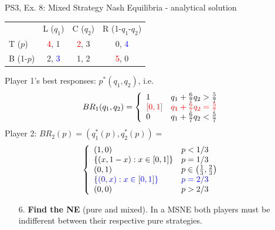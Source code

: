 \begin{frame}{PS3, Ex. 8: Mixed Strategy Nash Equilibria - analytical solution}
  \begin{multicols}{2}
    \begin{table}
      \begin{tabular}{l|c|c|c|}
          \multicolumn{1}{c}{}  & \multicolumn{1}{c}{L ($q_1$)} & \multicolumn{1}{c}{C ($q_2$)} & \multicolumn{1}{c}{R (1-$q_1$-$q_2$)} \\\cline{2-4}
          T ($p$)   & \textcolor{red}{4}, 1 & \textcolor{red}{2}, 3 & 0, \textcolor{blue}{4} \\\cline{2-4}
          B (1-$p$) & 2, \textcolor{blue}{3} & 1, 2 & \textcolor{red}{5}, 0 \\\cline{2-4}
      \end{tabular}
    \end{table}
    Player 1's best responses: $p^{*}(q_1,q_2)$, i.e.
    \begin{align*}
      BR_1(q_1,q_2)=
      \left\{ \begin{array}{ll}
          1                 & q_1 + \frac{6}{7}q_2 > \frac{5}{7}\\
          \textcolor{red}{\left[0,1\right]}  & \textcolor{red}{q_1 + \frac{6}{7}q_2 = \frac{5}{7}}\\
          0                 & q_1 + \frac{6}{7}q_2 < \frac{5}{7}
      \end{array}\right.
    \end{align*}
    Player 2: $BR_2(p)=\left(q_1^{*}(p),q_2^{*}(p)\right)=$
    \begin{align*}
      \left\{ \begin{array}{ll}
          (1,0)                 & p < 1/3 \\
          \{(x,1-x):x\in[0,1]\} & p = 1/3 \\
          (0,1)                 & p\in\left(\frac{1}{3},\frac{2}{3}\right)\\
          \textcolor{blue}{\{(0,x):x\in[0,1]\}}   & \textcolor{blue}{p = 2/3} \\
          (0,0)                 & p > 2/3
      \end{array}\right.
    \end{align*}
  \vfill\null \columnbreak
    \begin{itemize}
      \item[6.] \textbf{Find the NE} (pure and mixed). In a MSNE both players must be indifferent between their respective pure strategies.
    \end{itemize}

\end{multicols}
\end{frame}

